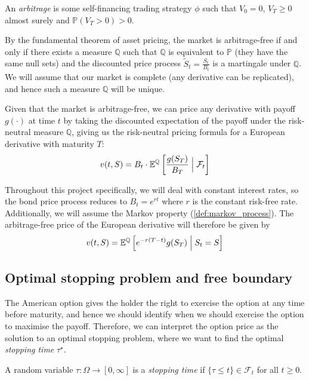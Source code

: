 \begin{definition}[Arbitrage]
    An \textit{arbitrage} is some self-financing trading strategy $\phi$ such that $V_0 = 0$, $V_T \ge 0$ almost surely and $\mathbb P(V_T > 0) > 0$.
\end{definition}

By the fundamental theorem of asset pricing, the market is arbitrage-free if and only if there exists a measure $\mathbb Q$ such that $\mathbb Q$ is equivalent to $\mathbb P$ (they have the same null sets) and the discounted price process $\tilde S_t = \frac{S_t}{B_t}$ is a martingale under $\mathbb Q$. We will assume that our market is complete (any derivative can be replicated), and hence such a measure $\mathbb Q$ will be unique.

Given that the market is arbitrage-free, we can price any derivative with payoff $g(\cdot)$ at time $t$ by taking the discounted expectation of the payoff under the risk-neutral measure $\mathbb Q$, giving us the risk-neutral pricing formula for a European derivative with maturity $T$:
\begin{equation}
    v(t, S) = B_t \cdot \mathbb E^\mathbb Q \left[\frac{g(S_T)}{B_T} \Bigm| \mathcal F_t\right]
\end{equation}

Throughout this project specifically, we will deal with constant interest rates, so the bond price process reduces to $B_t = e^{rt}$ where $r$ is the constant risk-free rate. Additionally, we will assume the Markov property (\ref{def:markov_process}). The arbitrage-free price of the European derivative will therefore be given by
\begin{equation}
    v(t, S) = \mathbb E^\mathbb Q \left[e^{-r(T-t)} g(S_T) \Bigm| S_t = S\right]
\label{eq:risk_neutral_pricing_european}
\end{equation}

\subsection{Optimal stopping problem and free boundary}

The American option gives the holder the right to exercise the option at any time before maturity, and hence we should identify when we should exercise the option to maximise the payoff. Therefore, we can interpret the option price as the solution to an optimal stopping problem, where we want to find the optimal \textit{stopping time} $\tau^\star$.

\begin{definition}
    A random variable $\tau : \Omega \to [0, \infty]$ is a \textit{stopping time} if $\{\tau \le t\} \in \mathcal F_t$ for all $t \ge 0$.
\end{definition}

